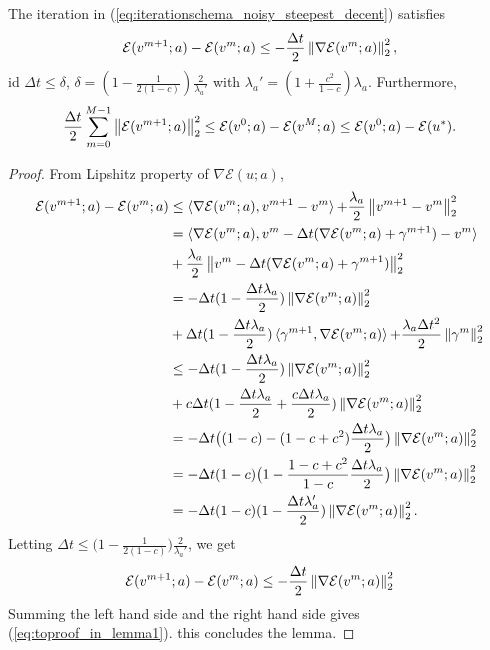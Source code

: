 \begin{lemma}
	\label{lemma1}
	The iteration in (\ref{eq:iterationschema_noisy_steepest_decent}) satisfies
	\begin{equation}
	\mathcal{E}(v^{m+1};a) - \mathcal{E}(v^m;a) \leq - \frac{\Delta t}{2} \left\lVert\nabla \mathcal{E}(v^m;a)\right\rVert_{2}^{2},
	\end{equation}
	id $\Delta t \leq \delta$, $\delta = (1-\frac{1}{2(1-c)}) \frac{2}{\lambda_{a}'}$ with $\lambda_{a}' = (1+ \frac{c^2}{1-c}) \lambda_{a}$. Furthermore, 
	\begin{equation}
	\label{eq:toproof_in_lemma1}
	\frac{\Delta t}{2} \sum_{m = 0}^{M-1} \left\lVert\mathcal{E}(v^{m+1};a)\right\rVert_{2}^{2} \leq \mathcal{E}(v^0;a) - \mathcal{E}(v^M;a) \leq \mathcal{E}(v^0;a) - \mathcal{E}(u^*).
	\end{equation}
	
	\begin{proof}
		From Lipshitz property of $\nabla \mathcal{E}(u;a)$,
		\begin{align*}
		\mathcal{E}(v^{m+1};a) - \mathcal{E}(v^m; a) & \leq \mathop{\langle \nabla \mathcal{E}(v^m;a), v^{m+1} - v^m \rangle} + \frac{\lambda_{a}}{2} \left\lVert v^{m+1} - v^m\right\rVert_{2}^{2}\\
		&= \mathop{\langle \nabla \mathcal{E}(v^m;a),  v^m - \Delta t(\nabla \mathcal{E}(v^m;a) + \gamma^{m+1}) - v^m \rangle} \\
		&+ \frac{\lambda_{a}}{2} \left\lVert v^m - \Delta t (\nabla \mathcal{E}(v^m;a) + \gamma^{m+1})\right\rVert_{2}^{2} \\
		&= - \Delta t(1-\frac{\Delta t \lambda_{a}}{2}) \left\lVert\nabla \mathcal{E}(v^m;a)\right\rVert_{2}^{2}\\
		&+ \Delta t (1- \frac{\Delta t \lambda_{a}}{2}) \mathop{\langle \gamma^{m+1}, \nabla \mathcal{E}(v^m;a) \rangle} + \frac{\lambda_{a} \Delta t^2}{2} \left\lVert\gamma^m\right\rVert_{2}^{2} \\ 
		&\leq -\Delta t (1-\frac{\Delta t \lambda_{a}}{2}) \left\lVert\nabla \mathcal{E}(v^m;a)\right\rVert_{2}^{2} \\
		&+ c\Delta t (1- \frac{\Delta t \lambda_{a}}{2} + \frac{c\Delta t \lambda_{a}}{2}) \left\lVert\nabla \mathcal{E}(v^m;a)\right\rVert_{2}^{2}\\
		&= - \Delta t \big( (1-c) - (1-c+c^2) \frac{\Delta t \lambda_{a}}{2} \big) \left\lVert\nabla \mathcal{E}(v^m;a)\right\rVert_{2}^{2}\\
		&=-\Delta t (1-c) \big( 1- \frac{1-c+c^2}{1-c} \frac{\Delta t \lambda_{a}}{2} \big) \left\lVert\nabla \mathcal{E}(v^m;a)\right\rVert_{2}^{2} \\
		&=-\Delta t (1-c) (1- \frac{\Delta t \lambda_{a}'}{2}) \left\lVert\nabla \mathcal{E}(v^m;a)\right\rVert_{2}^{2}.
		\end{align*}
		Letting $\Delta t \leq \big(1-\frac{1}{2(1-c)}\big) \frac{2}{\lambda_{a}'}$, we get 
		\begin{equation}
		\mathcal{E}(v^{m+1};a) - \mathcal{E}(v^m;a) \leq -\frac{\Delta t}{2} \left\lVert\nabla \mathcal{E}(v^m;a)\right\rVert_{2}^{2}
		\end{equation}
		Summing the left hand side and the right hand side gives (\ref{eq:toproof_in_lemma1}). this concludes the lemma.
	\end{proof}
\end{lemma}
